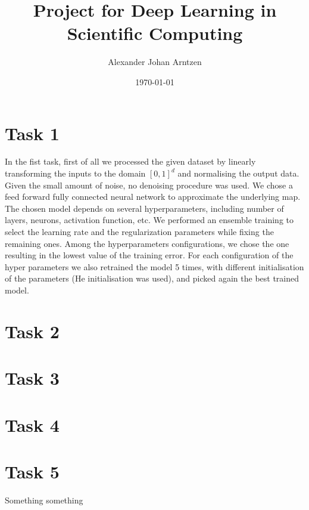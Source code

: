 \documentclass[a4paper]{article}
\title{Project for Deep Learning in Scientific Computing}
\author{Alexander Johan Arntzen }
\date{\today}
\begin{document}
\maketitle

\section*{Task 1}
In the fist task, first of all we processed the given dataset by linearly transforming the inputs to the domain $[0,1]^d$ and normalising the output data. Given the small amount of noise, no denoising procedure was used. We chose a feed forward fully connected neural network to approximate the underlying map. The chosen model depends  on several hyperparameters, including number of layers, neurons, activation function, etc. We performed an ensemble training to select the learning rate and the regularization parameters while fixing the remaining ones. Among the hyperparameters configurations, we chose the one resulting in the lowest value of the training error. For each configuration of the hyper parameters we also retrained the model 5 times, with different initialisation of the parameters (He initialisation was used), and picked again the best trained model.


\section*{Task 2}
\section*{Task 3}

\section*{Task 4}
\section*{Task 5}
Something something\cite{kingma2017adam}

\printbibliography
\end{document}
